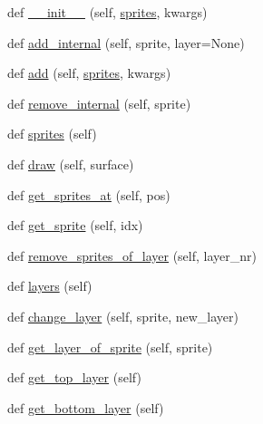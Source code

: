 \begin{DoxyCompactItemize}
\item 
def \hyperlink{classpygame_1_1sprite_1_1_layered_updates_aa398d6d3b6903d8a5a47b756fb9172e1}{\+\_\+\+\_\+init\+\_\+\+\_\+} (self, \hyperlink{classpygame_1_1sprite_1_1_layered_updates_a882f93b671aae75a92a8512e8cbbb61d}{sprites}, kwargs)
\item 
def \hyperlink{classpygame_1_1sprite_1_1_layered_updates_a44b2d26ee1704a97a9367f60954f703d}{add\+\_\+internal} (self, sprite, layer=None)
\item 
def \hyperlink{classpygame_1_1sprite_1_1_layered_updates_afd75d3284641e9ff987c21994b350fed}{add} (self, \hyperlink{classpygame_1_1sprite_1_1_layered_updates_a882f93b671aae75a92a8512e8cbbb61d}{sprites}, kwargs)
\item 
def \hyperlink{classpygame_1_1sprite_1_1_layered_updates_af7e25a22639a30a8686f660866fd406e}{remove\+\_\+internal} (self, sprite)
\item 
def \hyperlink{classpygame_1_1sprite_1_1_layered_updates_a882f93b671aae75a92a8512e8cbbb61d}{sprites} (self)
\item 
def \hyperlink{classpygame_1_1sprite_1_1_layered_updates_ac6343a93db51cf00cea51a406aef9573}{draw} (self, surface)
\item 
def \hyperlink{classpygame_1_1sprite_1_1_layered_updates_afbbf762f942018fb1eee8d42df5c4124}{get\+\_\+sprites\+\_\+at} (self, pos)
\item 
def \hyperlink{classpygame_1_1sprite_1_1_layered_updates_ae073cc5bfd5bc8cc40c0c5b2445214ac}{get\+\_\+sprite} (self, idx)
\item 
def \hyperlink{classpygame_1_1sprite_1_1_layered_updates_a5aa0b60731bd14f90548aeeb956a4cf3}{remove\+\_\+sprites\+\_\+of\+\_\+layer} (self, layer\+\_\+nr)
\item 
def \hyperlink{classpygame_1_1sprite_1_1_layered_updates_a81b70d20662914e45995c60d6a13a4a2}{layers} (self)
\item 
def \hyperlink{classpygame_1_1sprite_1_1_layered_updates_abf1df6b1a5ed9593d8c8d984105e3c56}{change\+\_\+layer} (self, sprite, new\+\_\+layer)
\item 
def \hyperlink{classpygame_1_1sprite_1_1_layered_updates_ab6d708ad4ba770ff7df5b6ec3150eb57}{get\+\_\+layer\+\_\+of\+\_\+sprite} (self, sprite)
\item 
def \hyperlink{classpygame_1_1sprite_1_1_layered_updates_aa85256f739f6c0386e94b026a561c993}{get\+\_\+top\+\_\+layer} (self)
\item 
def \hyperlink{classpygame_1_1sprite_1_1_layered_updates_a51f426f8ba99b455db930e772a073731}{get\+\_\+bottom\+\_\+layer} (self)

\end{DoxyCompactItemize}
